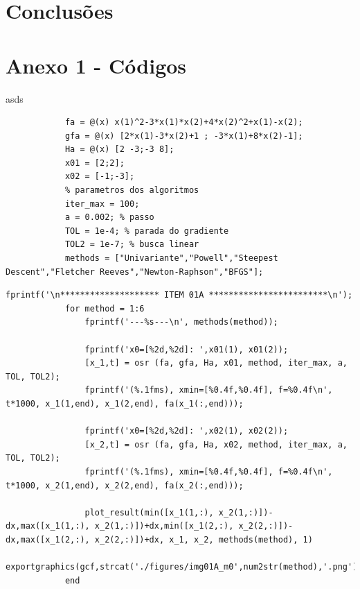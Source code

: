\documentclass[10pt, a4paper]{article}
\begin{document}
\section{Conclus\~oes}

\section{Anexo 1 - C\'odigos}

asds


\begin{minipage}{\linewidth}
      \begin{lstlisting}[style=myStyle, caption=script t01.m setando par\^ametros e criando as fun\c c\~oes, label=l1]
            % dados do item 01a, f, grad f, hess f e x0
            fa = @(x) x(1)^2-3*x(1)*x(2)+4*x(2)^2+x(1)-x(2);
            gfa = @(x) [2*x(1)-3*x(2)+1 ; -3*x(1)+8*x(2)-1];
            Ha = @(x) [2 -3;-3 8];
            x01 = [2;2];
            x02 = [-1;-3];
            % parametros dos algoritmos
            iter_max = 100;
            a = 0.002; % passo
            TOL = 1e-4; % parada do gradiente
            TOL2 = 1e-7; % busca linear
            methods = ["Univariante","Powell","Steepest Descent","Fletcher Reeves","Newton-Raphson","BFGS"];
      \end{lstlisting}
\end{minipage}

\begin{minipage}{\linewidth}
      \begin{lstlisting}[style=myStyle, caption=script t01.m chamando o script osr.m para a fun\c c\~ao do item 1a para cada um dos 6 m\'etodos estudados, label=l2]
            fprintf('\n******************** ITEM 01A ************************\n');
            for method = 1:6
                fprintf('---%s---\n', methods(method));

                fprintf('x0=[%2d,%2d]: ',x01(1), x01(2));
                [x_1,t] = osr (fa, gfa, Ha, x01, method, iter_max, a, TOL, TOL2);
                fprintf('(%.1fms), xmin=[%0.4f,%0.4f], f=%0.4f\n', t*1000, x_1(1,end), x_1(2,end), fa(x_1(:,end)));

                fprintf('x0=[%2d,%2d]: ',x02(1), x02(2));
                [x_2,t] = osr (fa, gfa, Ha, x02, method, iter_max, a, TOL, TOL2);
                fprintf('(%.1fms), xmin=[%0.4f,%0.4f], f=%0.4f\n', t*1000, x_2(1,end), x_2(2,end), fa(x_2(:,end)));

                plot_result(min([x_1(1,:), x_2(1,:)])-dx,max([x_1(1,:), x_2(1,:)])+dx,min([x_1(2,:), x_2(2,:)])-dx,max([x_1(2,:), x_2(2,:)])+dx, x_1, x_2, methods(method), 1)
                exportgraphics(gcf,strcat('./figures/img01A_m0',num2str(method),'.png'),'Resolution',500)
            end
      \end{lstlisting}
\end{minipage}
\end{document}
